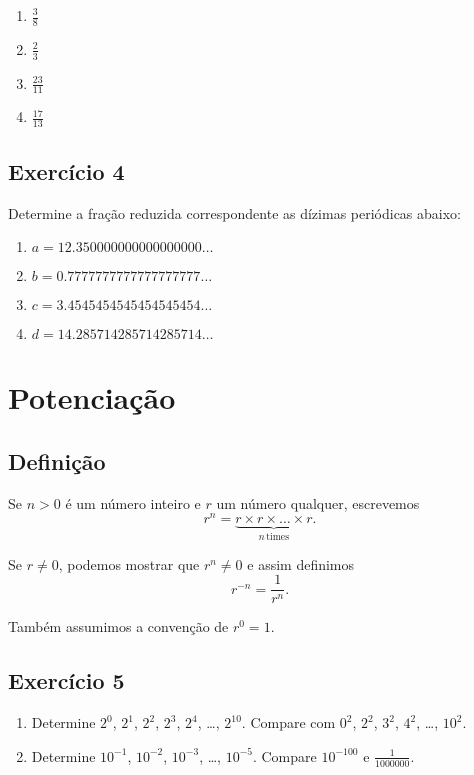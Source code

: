 \begin{enumerate}
\item $\frac{3}{8}$
\item $\frac{2}{3}$
\item $\frac{23}{11}$
\item $\frac{17}{13}$
\end{enumerate}

\subsection*{Exercício 4}

Determine a fração reduzida correspondente as dízimas periódicas abaixo:

\begin{enumerate}
\item $a = 12.350000000000000000\ldots$
\item $b = 0.7777777777777777777\ldots$
\item $c = 3.4545454545454545454\ldots$
\item $d = 14.285714285714285714\ldots$
\end{enumerate}

\section{Potenciação}

\subsection*{Definição}

Se $n > 0$ é um número inteiro e $r$ um número qualquer, escrevemos
$$r^n =
\underset{n\,\text{times}}{\underbrace{r \times r \times \ldots \times r}}.$$

Se $r \neq 0$, podemos mostrar que $r^n \neq 0$ e assim definimos
$$r^{-n} = \frac{1}{r^n}.$$

Também assumimos a convenção de $r^0 = 1$.

\subsection*{Exercício 5}

\begin{enumerate}
\item Determine $2^0$, $2^1$, $2^2$, $2^3$, $2^4$, \ldots, $2^{10}$. Compare com
$0^2$, $2^2$, $3^2$, $4^2$, \ldots, $10^2$.
\item Determine $10^{-1}$, $10^{-2}$, $10^{-3}$, \ldots, $10^{-5}$.
Compare $10^{-100}$ e $\frac{1}{1000000}$.
\end{enumerate}

